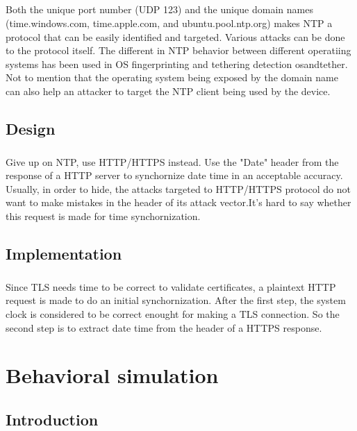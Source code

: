 \documentclass[mscthesis]{usiinfthesis}
\begin{document}
\paragraph{}
Both the unique port number (UDP 123) and the unique domain names (time.windows.com, time.apple.com, and ubuntu.pool.ntp.org) makes NTP a protocol that can be easily identified and targeted. Various attacks can be done to the protocol itself\citep{ntp:attack}. The different in NTP behavior between different operatiing systems has been used in OS fingerprinting and tethering detection {osandtether}. Not to mention that the operating system being exposed by the domain name can also help an attacker to target the NTP client being used by the device.

\section{Design}
\paragraph{}
Give up on NTP, use HTTP/HTTPS instead. Use the "Date" header from the response of a HTTP server to synchornize date time in an acceptable accuracy. Usually, in order to hide, the attacks targeted to HTTP/HTTPS protocol do not want to make mistakes in the header of its attack vector.It's hard to say whether this request is made for time synchornization.

\section{Implementation}
\paragraph{}
Since TLS needs time to be correct to validate certificates, a plaintext HTTP request is made to do an initial synchornization. After the first step, the system clock is considered to be correct enought for making a TLS connection. So the second step is to extract date time from the header of a HTTPS response.

\chapter{Behavioral simulation}
\section{Introduction}
\end{document}
